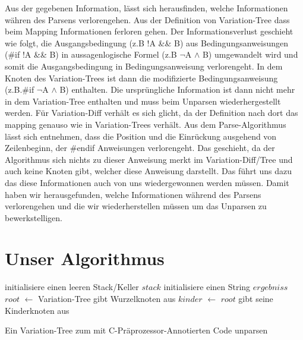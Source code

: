 Aus der gegebenen Information, lässt sich herausfinden, welche Informationen währen des Parsens verlorengehen. Aus der Definition von Variation-Tree dass beim Mapping Informationen ferloren gehen. Der Informationsverlust geschieht wie folgt, die Ausgangsbedingung (z.B !A \&\& B) aus Bedingungsanweisungen (\#if !A \&\& B) in aussagenlogische Formel (z.B $\lnot$A $\land$ B) umgewandelt wird und somit die Ausgangsbedingung in Bedingungsanweisung verlorengeht. In dem Knoten des Variation-Trees ist dann die modifizierte Bedingungsanweisung (z.B.\#if $\lnot$A $\land$ B) enthalten. Die ursprüngliche Information ist dann nicht mehr in dem Variation-Tree enthalten und muss beim Unparsen wiederhergestellt werden. Für Variation-Diff verhält es sich glicht, da der Definition nach dort das mapping genauso wie in Variation-Trees verhält. Aus dem Parse-Algorithmus lässt sich entnehmen, dass die Position und die Einrückung ausgehend von Zeilenbeginn, der \#endif Anweisungen verlorengeht. Das geschieht, da der Algorithmus sich nichts zu dieser Anweisung merkt im Variation-Diff/Tree und auch keine Knoten gibt, welcher diese Anweisung darstellt. Das führt uns dazu das diese Informationen auch von uns wiedergewonnen werden müssen. Damit haben wir herausgefunden, welche Informationen während des Parsens verlorengehen und die wir wiederherstellen müssen um das Unparsen zu bewerkstelligen.






\section{Unser Algorithmus}




\begin{algorithm}[H]
	\SetAlgoLined
	\DontPrintSemicolon
	initialisiere einen leeren Stack/Keller $stack$\;
	initialisiere einen String $ergebniss$
	$root$ $\leftarrow$ Variation-Tree gibt Wurzelknoten aus\;
	$kinder$ $\leftarrow$ $root$ gibt seine Kinderknoten aus\;
	\caption{Ein Variation-Tree zum mit C-Präprozessor-Annotierten Code unparsen}
\end{algorithm}

